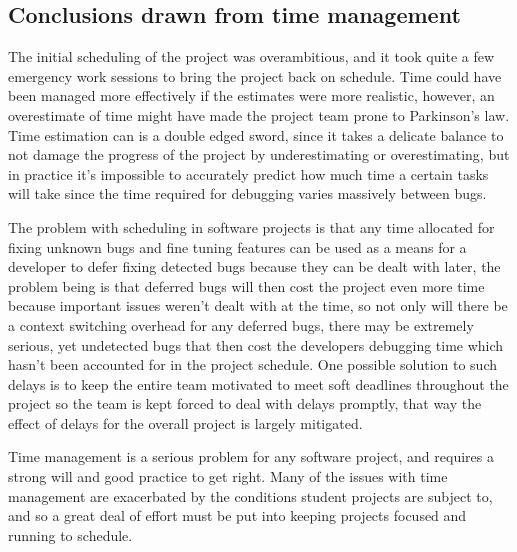 \subsection{Conclusions drawn from time management}
The initial scheduling of the project was overambitious, and it took quite a few emergency work sessions to bring the project back on schedule. Time could have been managed more effectively if the estimates were more realistic, however, an overestimate of time might have made the project team prone to Parkinson's law.\cite{bryan1967parkinson} Time estimation can is a double edged sword, since it takes a delicate balance to not damage the progress of the project by underestimating or overestimating, but in practice it's impossible to accurately predict how much time a certain tasks will take since the time required for debugging varies massively between bugs. 

The problem with scheduling in software projects is that any time allocated for fixing unknown bugs and fine tuning features can be used as a means for a developer to defer fixing detected bugs because they can be dealt with later, the problem being is that deferred bugs will then cost the project even more time because important issues weren't dealt with at the time, so not only will there be a context switching overhead for any deferred bugs, there may be extremely serious, yet undetected bugs that then cost the developers debugging time which hasn't been accounted for in the project schedule.\cite{bryan1967parkinson} One possible solution to such delays is to keep the entire team motivated to meet soft deadlines throughout the project so the team is kept forced to deal with delays promptly, that way the effect of delays for the overall project is largely mitigated. 

Time management is a serious problem for any software project, and requires a strong will and good practice to get right. Many of the issues with time management are exacerbated by the conditions student projects are subject to, and so a great deal of effort must be put into keeping projects focused and running to schedule.

